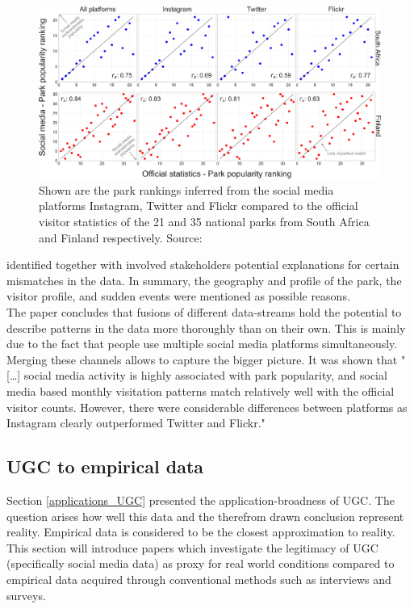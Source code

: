 \begin{figure}[h]
   \centering
   \includegraphics[width=\textwidth]{img/tenkanen_2017_SMPs.pdf}
   \caption{Shown are the park rankings inferred from the social media platforms Instagram, Twitter and Flickr compared to the official visitor statistics of the 21 and 35 national parks from South Africa and Finland respectively. Source: \textcite[p.4]{Tenkanen2017}}
   \label{fig:tenkanen_SMP}
\end{figure}

\textcite{Tenkanen2017} identified together with involved stakeholders potential explanations for certain mismatches in the data. In summary, the geography and profile of the park, the visitor profile, and sudden events were mentioned as possible reasons.\\
The paper concludes that fusions of different data-streams hold the potential to describe patterns in the data more thoroughly than on their own. This is mainly due to the fact that people use multiple social media platforms simultaneously. Merging these channels allows to capture the bigger picture.
It was shown that "[\dots] social media activity is highly associated with park popularity, and social media based monthly visitation patterns match relatively well with the official visitor counts. However, there were considerable differences between platforms as Instagram clearly outperformed Twitter and Flickr."\parencite[p.1]{Tenkanen2017}

\subsection{UGC to empirical data} \label{ugc_vs_empirical}
Section \ref{applications_UGC} presented the application-broadness of UGC. The question arises how well this data and the therefrom drawn conclusion represent reality. Empirical data is considered to be the closest approximation to reality. This section will introduce papers which investigate the legitimacy of UGC (specifically social media data) as proxy for real world conditions compared to empirical data acquired through conventional methods such as interviews and surveys.

